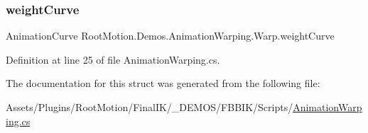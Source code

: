 \subsubsection{\texorpdfstring{weight\+Curve}{weightCurve}}
{\footnotesize\ttfamily Animation\+Curve Root\+Motion.\+Demos.\+Animation\+Warping.\+Warp.\+weight\+Curve}



Definition at line 25 of file Animation\+Warping.\+cs.



The documentation for this struct was generated from the following file\+:\begin{DoxyCompactItemize}
\item 
Assets/\+Plugins/\+Root\+Motion/\+Final\+I\+K/\+\_\+\+D\+E\+M\+O\+S/\+F\+B\+B\+I\+K/\+Scripts/\mbox{\hyperlink{_animation_warping_8cs}{Animation\+Warping.\+cs}}\end{DoxyCompactItemize}
